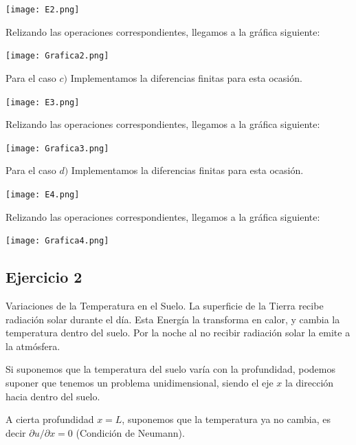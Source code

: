 \documentclass[12pt]{article}
\begin{document}
\begin{center}
    \texttt{[image: E2.png]}
\end{center}

Relizando las operaciones correspondientes, llegamos a la gráfica siguiente:

\begin{center}
    \texttt{[image: Grafica2.png]}
\end{center}


Para el caso $c)$ Implementamos la diferencias finitas para esta ocasión.

\begin{center}
    \texttt{[image: E3.png]}
\end{center}

Relizando las operaciones correspondientes, llegamos a la gráfica siguiente:

\begin{center}
    \texttt{[image: Grafica3.png]}
\end{center}


Para el caso $d)$ Implementamos la diferencias finitas para esta ocasión.

\begin{center}
    \texttt{[image: E4.png]}
\end{center}

Relizando las operaciones correspondientes, llegamos a la gráfica siguiente:

\begin{center}
    \texttt{[image: Grafica4.png]}
\end{center}


\subsection{Ejercicio 2}

Variaciones de la Temperatura en el Suelo. La superficie de la Tierra recibe radiación solar durante el día. Esta Energía la transforma en calor, y cambia la temperatura dentro del suelo. Por la noche al no recibir radiación solar la emite a la atmósfera. 

Si suponemos que la temperatura del suelo varía con la profundidad, podemos suponer que tenemos un problema unidimensional, siendo el eje $x$ la dirección hacia dentro del suelo.

A cierta profundidad $x=L$, suponemos que la temperatura ya no cambia, es decir $\partial u/\partial x = 0$ (Condición de Neumann).
\end{document}
